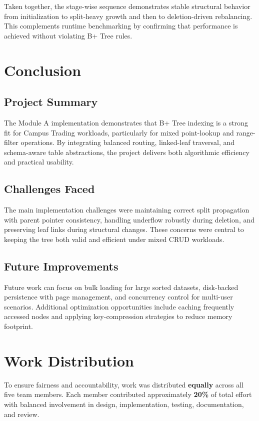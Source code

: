 \documentclass[12pt, a4paper]{article}
\begin{document}
Taken together, the stage-wise sequence demonstrates stable structural behavior from initialization to split-heavy growth and then to deletion-driven rebalancing. This complements runtime benchmarking by confirming that performance is achieved without violating B+ Tree rules.

\section{Conclusion}
\subsection{Project Summary}
The Module A implementation demonstrates that B+ Tree indexing is a strong fit for Campus Trading workloads, particularly for mixed point-lookup and range-filter operations. By integrating balanced routing, linked-leaf traversal, and schema-aware table abstractions, the project delivers both algorithmic efficiency and practical usability.

\subsection{Challenges Faced}
The main implementation challenges were maintaining correct split propagation with parent pointer consistency, handling underflow robustly during deletion, and preserving leaf links during structural changes. These concerns were central to keeping the tree both valid and efficient under mixed CRUD workloads.

\subsection{Future Improvements}
Future work can focus on bulk loading for large sorted datasets, disk-backed persistence with page management, and concurrency control for multi-user scenarios. Additional optimization opportunities include caching frequently accessed nodes and applying key-compression strategies to reduce memory footprint.

\section{Work Distribution}
To ensure fairness and accountability, work was distributed \textbf{equally} across all five team members. Each member contributed approximately \textbf{20\%} of total effort with balanced involvement in design, implementation, testing, documentation, and review.
\end{document}
